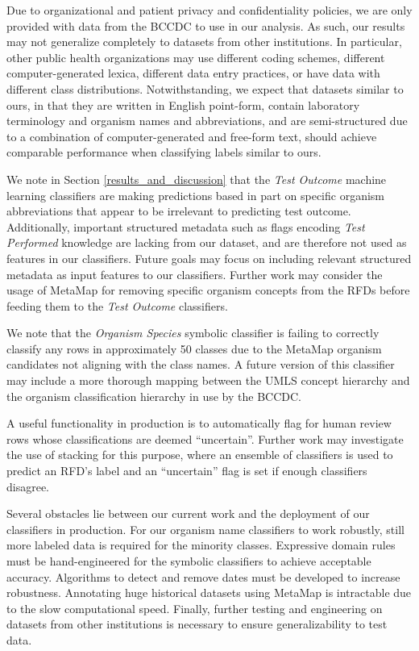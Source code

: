 \documentclass[sigconf]{acmart}
\begin{document}
Due to organizational and patient privacy and confidentiality policies, we are only provided with data from the BCCDC to use in our analysis. As such, our results may not generalize completely to datasets from other institutions. In particular, other public health organizations may use different coding schemes, different computer-generated lexica, different data entry practices, or have data with different class distributions. Notwithstanding, we expect that datasets similar to ours, in that they are written in English point-form, contain laboratory terminology and organism names and abbreviations, and are semi-structured due to a combination of computer-generated and free-form text, should achieve comparable performance when classifying labels similar to ours.

We note in Section \ref{results_and_discussion} that the \textit{Test Outcome} machine learning classifiers are making predictions based in part on specific organism abbreviations that appear to be irrelevant to predicting test outcome. Additionally, important structured metadata such as flags encoding \textit{Test Performed} knowledge are lacking from our dataset, and are therefore not used as features in our classifiers. Future goals may focus on including relevant structured metadata as input features to our classifiers. Further work may consider the usage of MetaMap for removing specific organism concepts from the RFDs before feeding them to the \textit{Test Outcome} classifiers.

We note that the \textit{Organism Species} symbolic classifier is failing to correctly classify any rows in approximately 50 classes due to the MetaMap organism candidates not aligning with the class names. A future version of this classifier may include a more thorough mapping between the UMLS concept hierarchy and the organism classification hierarchy in use by the BCCDC.

A useful functionality in production is to automatically flag for human review rows whose classifications are deemed ``uncertain''. Further work may investigate the use of stacking for this purpose, where an ensemble of classifiers is used to predict an RFD's label and an ``uncertain'' flag is set if enough classifiers disagree.

Several obstacles lie between our current work and the deployment of our classifiers in production. For our organism name classifiers to work robustly, still more labeled data is required for the minority classes. Expressive domain rules must be hand-engineered for the symbolic classifiers to achieve acceptable accuracy. Algorithms to detect and remove dates must be developed to increase robustness. Annotating huge historical datasets using MetaMap is intractable due to the slow computational speed. Finally, further testing and engineering on datasets from other institutions is necessary to ensure generalizability to test data.
\end{document}
